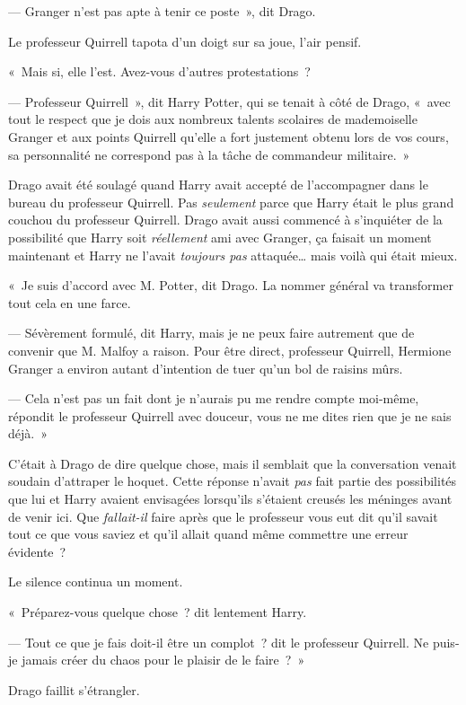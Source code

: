 --- Granger n'est pas apte à tenir ce poste~», dit Drago.

Le professeur Quirrell tapota d'un doigt sur sa joue, l'air pensif.

«~Mais si, elle l'est. Avez-vous d'autres protestations~?

--- Professeur Quirrell~», dit Harry Potter, qui se tenait à côté de Drago, «~avec tout le respect que je dois aux nombreux talents scolaires de mademoiselle Granger et aux points Quirrell qu'elle a fort justement obtenu lors de vos cours, sa personnalité ne correspond pas à la tâche de commandeur militaire.~»

Drago avait été soulagé quand Harry avait accepté de l'accompagner dans le bureau du professeur Quirrell. Pas \emph{seulement} parce que Harry était le plus grand couchou du professeur Quirrell. Drago avait aussi commencé à s'inquiéter de la possibilité que Harry soit \emph{réellement} ami avec Granger, ça faisait un moment maintenant et Harry ne l'avait \emph{toujours pas} attaquée… mais voilà qui était mieux.

«~Je suis d'accord avec M. Potter, dit Drago. La nommer général va transformer tout cela en une farce.

--- Sévèrement formulé, dit Harry, mais je ne peux faire autrement que de convenir que M. Malfoy a raison. Pour être direct, professeur Quirrell, Hermione Granger a environ autant d'intention de tuer qu'un bol de raisins mûrs.

--- Cela n'est pas un fait dont je n'aurais pu me rendre compte moi-même, répondit le professeur Quirrell avec douceur, vous ne me dites rien que je ne sais déjà.~»

C'était à Drago de dire quelque chose, mais il semblait que la conversation venait soudain d'attraper le hoquet. Cette réponse n'avait \emph{pas} fait partie des possibilités que lui et Harry avaient envisagées lorsqu'ils s'étaient creusés les méninges avant de venir ici. Que \emph{fallait-il} faire après que le professeur vous eut dit qu'il savait tout ce que vous saviez et qu'il allait quand même commettre une erreur évidente~?

Le silence continua un moment.

«~Préparez-vous quelque chose~? dit lentement Harry.

--- Tout ce que je fais doit-il être un complot~? dit le professeur Quirrell. Ne puis-je jamais créer du chaos pour le plaisir de le faire~?~»

Drago faillit s'étrangler.

